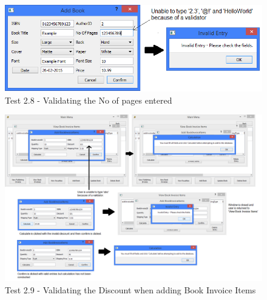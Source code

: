 \begin{landscape}
\begin{figure}[H]
    \includegraphics[width=\textwidth]{./Testing/Evidence/Series2/PagesRejection.png}
    \caption{Test 2.8 - Validating the No of pages entered}  \label{fig:PagesRejection}
\end{figure}

\begin{figure}[H]
    \includegraphics[width=\textwidth]{./Testing/Evidence/Series2/BookInvoiceDiscountValidation.png}
    \caption{Test 2.9 -  Validating the Discount when adding Book Invoice Items}  \label{fig:BookInvoiceDiscountValidation}
\end{figure}


\end{landscape}

